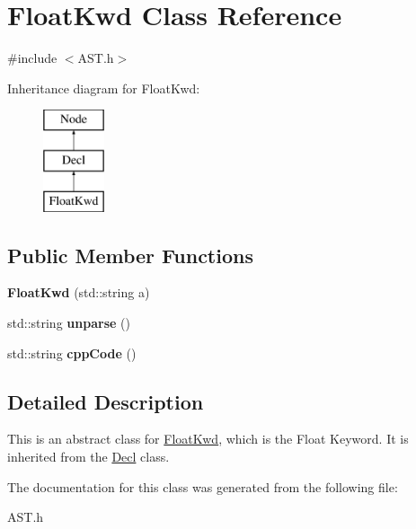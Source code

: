 \hypertarget{class_float_kwd}{}\section{Float\+Kwd Class Reference}
\label{class_float_kwd}


{\ttfamily \#include $<$A\+S\+T.\+h$>$}

Inheritance diagram for Float\+Kwd\+:\begin{figure}[H]
\begin{center}
\leavevmode
\includegraphics[height=3.000000cm]{class_float_kwd}
\end{center}
\end{figure}
\subsection*{Public Member Functions}
\begin{DoxyCompactItemize}
\item 
\hypertarget{class_float_kwd_a03c63a00dbf6fd640751e9dff8386670}{}{\bfseries Float\+Kwd} (std\+::string a)\label{class_float_kwd_a03c63a00dbf6fd640751e9dff8386670}

\item 
\hypertarget{class_float_kwd_aaf6dcc0b472c303d0efdbc5d4b407d44}{}std\+::string {\bfseries unparse} ()\label{class_float_kwd_aaf6dcc0b472c303d0efdbc5d4b407d44}

\item 
\hypertarget{class_float_kwd_a8ccee71358346e396a4557e8032fab67}{}std\+::string {\bfseries cpp\+Code} ()\label{class_float_kwd_a8ccee71358346e396a4557e8032fab67}

\end{DoxyCompactItemize}


\subsection{Detailed Description}
This is an abstract class for \hyperlink{class_float_kwd}{Float\+Kwd}, which is the Float Keyword. It is inherited from the \hyperlink{class_decl}{Decl} class. 

The documentation for this class was generated from the following file\+:\begin{DoxyCompactItemize}
\item 
A\+S\+T.\+h\end{DoxyCompactItemize}
